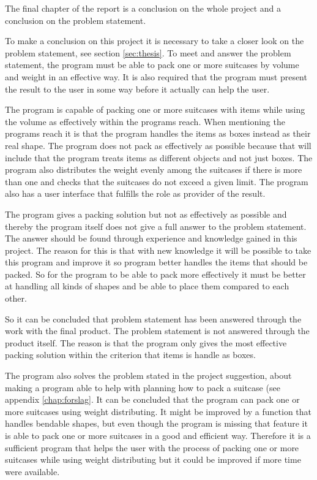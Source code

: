 The final chapter of the report is a conclusion on the whole project and a conclusion on the problem statement.

To make a conclusion on this project it is necessary to take a closer look on the problem statement, see section \ref{sec:thesis}. To meet and answer the problem statement, the program must be able to pack one or more suitcases by volume and weight in an effective way. It is also required that the program must present the result to the user in some way before it actually can help the user.

The program is capable of packing one or more suitcases with items while using the volume as effectively within the programs reach. When mentioning the programs reach it is that the program handles the items as boxes instead as their real shape.
The program does not pack as effectively as possible because that will include that the program treats items as different objects and not just boxes. The program also distributes the weight evenly among the suitcases if there is more than one and checks that the suitcases do not exceed a given limit. The program also has a user interface that fulfills the role as provider of the result.

The program gives a packing solution but not as effectively as possible and thereby the program itself does not give a full answer to the problem statement. The answer should be found through experience and knowledge gained in this project. The reason for this is that with new knowledge it will be possible to take this program and improve it so program better handles the items that should be packed. So for the program to be able to pack more effectively it must be better at handling all kinds of shapes and be able to place them compared to each other.

So it can be concluded that problem statement has been answered through the work with the final product. The problem statement is not answered through the product itself. The reason is that the program only gives the most effective packing solution within the criterion that items is handle as boxes.

The program also solves the problem stated in the project suggestion, about making a program able to help with planning how to pack a suitcase (see appendix \ref{chap:forslag}. It can be concluded that the program can pack one or more suitcases using weight distributing. It might be improved by a function that handles bendable shapes, but even though the program is missing that feature it is able to pack one or more suitcases in a good and efficient way. Therefore it is a sufficient program that helps the user with the process of packing one or more suitcases while using weight distributing but it could be improved if more time were available.

